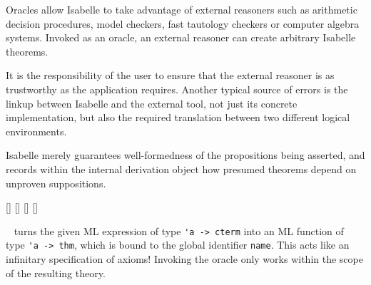 \begin{isabellebody}
\begin{isamarkuptext}
  Oracles allow Isabelle to take advantage of external reasoners such
  as arithmetic decision procedures, model checkers, fast tautology
  checkers or computer algebra systems.  Invoked as an oracle, an
  external reasoner can create arbitrary Isabelle theorems.

  It is the responsibility of the user to ensure that the external
  reasoner is as trustworthy as the application requires.  Another
  typical source of errors is the linkup between Isabelle and the
  external tool, not just its concrete implementation, but also the
  required translation between two different logical environments.

  Isabelle merely guarantees well-formedness of the propositions being
  asserted, and records within the internal derivation object how
  presumed theorems depend on unproven suppositions.

  \begin{railoutput}
[]
[]
[]
[]
\rail@end
\end{railoutput}


  \begin{description}

  \item \hyperlink{command.oracle}{\mbox{}}~ turns the given ML
  expression  of type \verb|'a -> cterm| into an
  ML function of type \verb|'a -> thm|, which is bound to the
  global identifier \verb|name|.  This acts like an infinitary
  specification of axioms!  Invoking the oracle only works within the
  scope of the resulting theory.

  \end{description}


\end{isamarkuptext}
\end{isabellebody}

